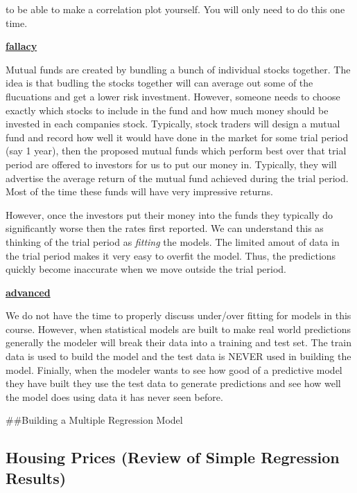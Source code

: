 \documentclass[
]{book}
\newenvironment{rmdblock}[1]
  {\begin{shaded*}
  \centerline{\underline{\textbf{#1}}}

  }
  {
  \end{shaded*}
  }
\newenvironment{advanced}
  {\begin{rmdblock}{advanced}}
  {\end{rmdblock}}
\newenvironment{fallacy}
  {\begin{rmdblock}{fallacy}}
  {\end{rmdblock}}
\theoremstyle{definition}
\theoremstyle{definition}
\theoremstyle{definition}
\theoremstyle{definition}
\theoremstyle{remark}
\begin{document}
to be able to make a correlation plot yourself. You will only need to do this one time.

\begin{fallacy}
Mutual funds are created by bundling a bunch of individual stocks together. The idea is that budling the stocks together will can average out some of the flucuations and get a lower risk investment. However, someone needs to choose exactly which stocks to include in the fund and how much money should be invested in each companies stock. Typically, stock traders will design a mutual fund and record how well it would have done in the market for some trial period (say 1 year), then the proposed mutual funds which perform best over that trial period are offered to investors for us to put our money in. Typically, they will advertise the average return of the mutual fund achieved during the trial period. Most of the time these funds will have very impressive returns.

However, once the investors put their money into the funds they typically do significantly worse then the rates first reported. We can understand this as thinking of the trial period as \emph{fitting} the models. The limited amout of data in the trial period makes it very easy to overfit the model. Thus, the predictions quickly become inaccurate when we move outside the trial period.
\end{fallacy}

\begin{advanced}
We do not have the time to properly discuss under/over fitting for models in this course. However, when statistical models are built to make real world predictions generally the modeler will break their data into a training and test set. The train data is used to build the model and the test data is NEVER used in building the model. Finially, when the modeler wants to see how good of a predictive model they have built they use the test data to generate predictions and see how well the model does using data it has never seen before.
\end{advanced}

\#\#Building a Multiple Regression Model

\hypertarget{housing-prices-review-of-simple-regression-results}{%
\subsection{Housing Prices (Review of Simple Regression Results)}\label{housing-prices-review-of-simple-regression-results}}
\end{document}
